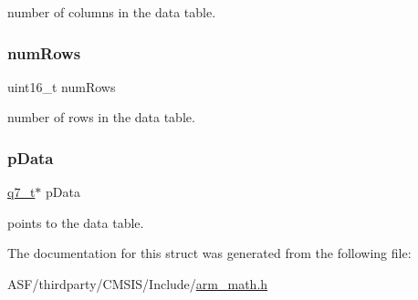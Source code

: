 number of columns in the data table. \mbox{\label{structarm__bilinear__interp__instance__q7_a1bcf80ccdc2acc29198f1592ae300390}} 
\subsubsection{\texorpdfstring{numRows}{numRows}}
{\footnotesize\ttfamily uint16\+\_\+t num\+Rows}

number of rows in the data table. \mbox{\label{structarm__bilinear__interp__instance__q7_afde7546ea2ec5df9fe42fb04d128a016}} 
\subsubsection{\texorpdfstring{pData}{pData}}
{\footnotesize\ttfamily \mbox{\hyperlink{arm__math_8h_ae541b6f232c305361e9b416fc9eed263}{q7\+\_\+t}}$\ast$ p\+Data}

points to the data table. 

The documentation for this struct was generated from the following file\+:\begin{DoxyCompactItemize}
\item 
A\+S\+F/thirdparty/\+C\+M\+S\+I\+S/\+Include/\mbox{\hyperlink{arm__math_8h}{arm\+\_\+math.\+h}}\end{DoxyCompactItemize}
